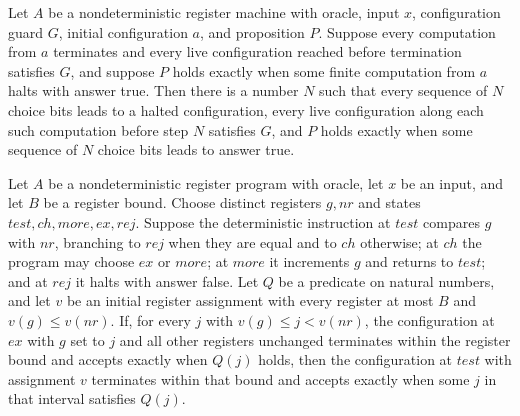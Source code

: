 \begin{theorem}
\label{Complexity.LogProg.NSem.decides}
\leanok
{}
Let $A$ be a nondeterministic register machine with oracle, input $x$, configuration
guard $G$, initial configuration $a$, and proposition $P$. Suppose every computation
from $a$ terminates and every live configuration reached before termination satisfies
$G$, and suppose $P$ holds exactly when some finite computation from $a$ halts with
answer true. Then there is a number $N$ such that every sequence of $N$ choice bits
leads to a halted configuration, every live configuration along each such computation
before step $N$ satisfies $G$, and $P$ holds exactly when some sequence of $N$ choice
bits leads to answer true.
\end{theorem}

\begin{theorem}
\label{Complexity.LogProg.nsem_guess}
\leanok
{}
Let $A$ be a nondeterministic register program with oracle, let $x$ be an input, and let
$B$ be a register bound. Choose distinct registers $g,nr$ and states
$test,ch,more,ex,rej$. Suppose the deterministic instruction at $test$ compares $g$ with
$nr$, branching to $rej$ when they are equal and to $ch$ otherwise; at $ch$ the program
may choose $ex$ or $more$; at $more$ it increments $g$ and returns to $test$; and at
$rej$ it halts with answer false. Let $Q$ be a predicate on natural numbers, and let $v$
be an initial register assignment with every register at most $B$ and $v(g)\le v(nr)$.
If, for every $j$ with $v(g)\le j<v(nr)$, the configuration at $ex$ with $g$ set to $j$
and all other registers unchanged terminates within the register bound and accepts
exactly when $Q(j)$ holds, then the configuration at $test$ with assignment $v$
terminates within that bound and accepts exactly when some $j$ in that interval
satisfies $Q(j)$.
\end{theorem}

